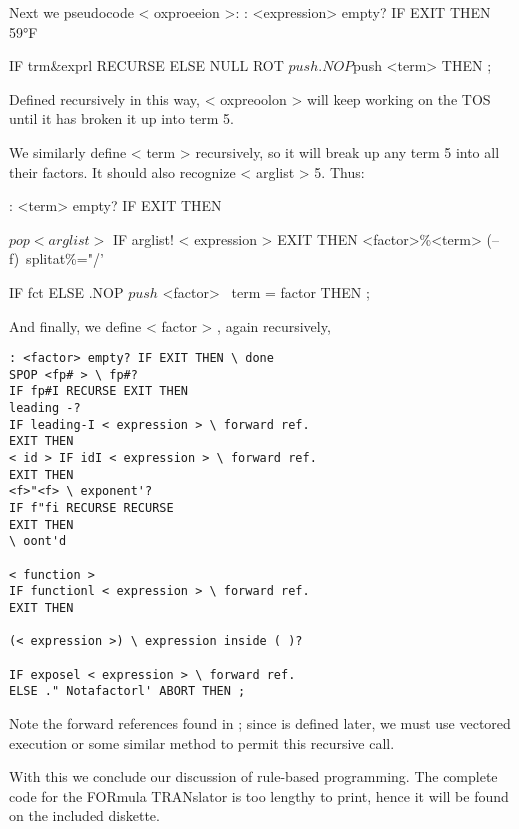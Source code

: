 Next we pseudocode < oxproeeion >:
: <expression> empty? IF EXIT THEN
59°F


IF trm\&exprl RECURSE
ELSE NULL ROT $push
.NOP $push <term>
THEN ;

Defined recursively in this way, < oxpreoolon > will keep
working on the TOS until it has broken it up into term 5.

We similarly define < term > recursively, so it will break up any
term 5 into all their factors. It should also recognize < arglist > 5.
Thus:

: <term> empty? IF EXIT THEN

$pop < arglist >$
IF arglist! < expression > EXIT THEN
<factor>\%<term> (--f)\ splitat\%="/'

IF fct%
ELSE .NOP $push$ <factor> \ term = factor
THEN ;

And finally, we define < factor > , again recursively,
\begin{lstlisting}
: <factor> empty? IF EXIT THEN \ done
SPOP <fp# > \ fp#?
IF fp#I RECURSE EXIT THEN
leading -?
IF leading-I < expression > \ forward ref.
EXIT THEN
< id > IF idI < expression > \ forward ref.
EXIT THEN
<f>"<f> \ exponent'?
IF f"fi RECURSE RECURSE
EXIT THEN
\ oont'd

< function >
IF functionl < expression > \ forward ref.
EXIT THEN

(< expression >) \ expression inside ( )?

IF exposel < expression > \ forward ref.
ELSE ." Notafactorl' ABORT THEN ;
\end{lstlisting}

\leftbar[1\linewidth]
Note the forward references found in ; since  is defined later, we must use vectored execution or some similar method to permit this recursive call.
\endleftbar

With this we conclude our discussion of rule-based programming. The complete code for the FORmula TRANslator is too lengthy to print, hence it will be found on the included diskette.
